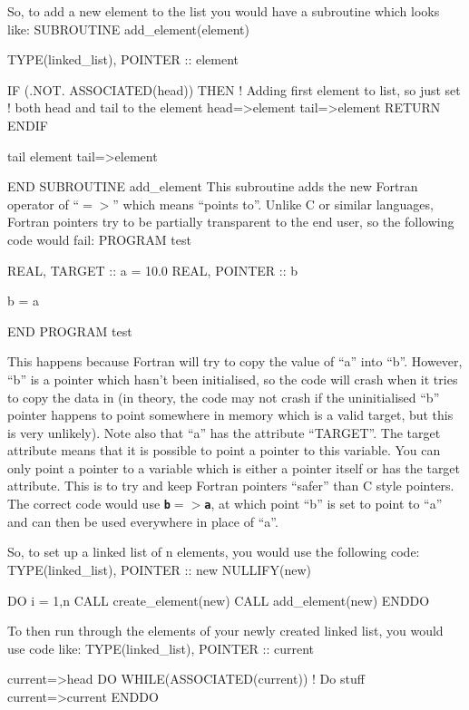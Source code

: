 \documentclass[12pt,a4paper]{article}
\newcommand{\inlinecode}[1]{{\color{warwickred} \bf\texttt{#1}}}
\newenvironment{boxverbatim}{\lboxverbatim{none}}{\endlboxverbatim}
\begin{document}
So, to add a new element to the list you would have a subroutine which looks
like:
\begin{boxverbatim}
SUBROUTINE add_element(element)

  TYPE(linked_list), POINTER :: element

  IF (.NOT. ASSOCIATED(head)) THEN
    ! Adding first element to list, so just set
    ! both head and tail to the element
    head=>element
    tail=>element
    RETURN
  ENDIF

  tail%
  element%
  tail=>element

END SUBROUTINE add_element
\end{boxverbatim}
This subroutine adds the new Fortran operator of ``$=>$'' which means ``points
to''. Unlike C or similar languages, Fortran pointers try to be partially
transparent to the end user, so the following code would fail:
\begin{boxverbatim}
PROGRAM test

  REAL, TARGET :: a = 10.0
  REAL, POINTER :: b

  b = a

END PROGRAM test
\end{boxverbatim}

This happens because Fortran will try to copy the value of ``a'' into ``b''.
However, ``b'' is a pointer which hasn't been initialised, so the code will
crash when it tries to copy the data in (in theory, the code may not crash if
the uninitialised ``b'' pointer happens to point somewhere in memory which is
a valid target, but this is very unlikely). Note also that ``a'' has the
attribute ``TARGET''. The target attribute means that it is possible to point
a pointer to this variable. You can only point a pointer to a variable which
is either a pointer itself or has the target attribute. This is to try and
keep Fortran pointers ``safer'' than C style pointers. The correct code would
use \inlinecode{b$=>$a}, at which point ``b'' is set to point to ``a'' and
can then be used everywhere in place of ``a''.

So, to set up a linked list of n elements, you would use the following code:
\begin{boxverbatim}
TYPE(linked_list), POINTER :: new
NULLIFY(new)

DO i = 1,n
  CALL create_element(new)
  CALL add_element(new)
ENDDO
\end{boxverbatim}

To then run through the elements of your newly created linked list, you would
use code like:
\begin{boxverbatim}
TYPE(linked_list), POINTER :: current

current=>head
DO WHILE(ASSOCIATED(current))
  ! Do stuff
  current=>current%
ENDDO
\end{boxverbatim}
\end{document}
